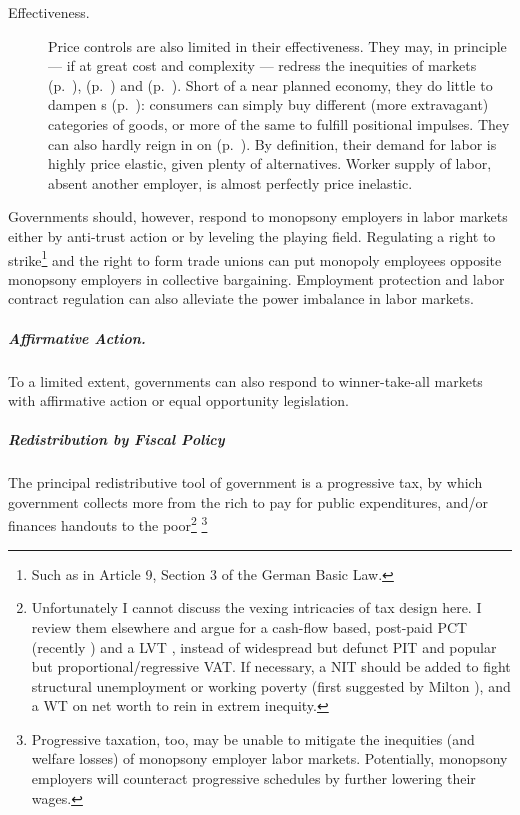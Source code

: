 \begin{description}
	\item[Effectiveness.] 
		Price controls are also limited in their effectiveness. They may, in principle --- if at great cost and complexity --- redress the inequities of  markets (p.~\pageref{sec:winne-take-all}),  (p.~\pageref{sec:differentbudgetconstraints}) and  (p.~\pageref{sec:diminishingmarginalutility}). Short of a near planned economy, they do little to dampen s (p.~\pageref{sec:positionalrace}):  consumers can simply buy different (more extravagant) categories of goods, or more of the same to fulfill positional impulses. They can also hardly reign in on  (p.~\pageref{sec:monopsonyemployers}). By definition, their demand for labor is highly price elastic, given plenty of alternatives. Worker supply of labor, absent another employer, is almost perfectly price inelastic. 
\end{description}

Governments should, however, respond to monopsony employers in labor markets either by anti-trust action or by leveling the playing field. Regulating a right to strike\footnote{Such as in Article 9, Section 3 of the German Basic Law.} and the right to form trade unions can put monopoly employees opposite monopsony employers in collective bargaining. Employment protection and labor contract regulation can also alleviate the power imbalance in labor markets.

\subparagraph{Affirmative Action.}  \label{sec:affirmativeaction} To a limited extent, governments can also respond to winner-take-all markets with affirmative action or equal opportunity legislation.

\subparagraph{Redistribution by Fiscal Policy}  \label{sec:fiscalredistribution} The principal redistributive tool of government is a progressive tax, by which government collects more from the rich to pay for public expenditures, and/or finances handouts to the poor\footnote{
	Unfortunately I cannot discuss the vexing intricacies of tax design here. I review them elsewhere \citep{Held2010a} and argue for a cash-flow based, post-paid \gls{PCT} (recently \citealt{McCaffery2002,McCaffery2005}) and a \gls{LVT} \citep{George1879}, instead of widespread but defunct \gls{PIT} and popular but proportional/regressive \gls{VAT}. If necessary, a \gls{NIT} should be added to fight structural unemployment or working poverty (first suggested by Milton \citealt{Friedman1962}), and a \gls{WT} on net worth to rein in extrem inequity.}
	\footnote{
	Progressive taxation, too, may be unable to mitigate the inequities (and welfare losses) of monopsony employer labor markets. Potentially, monopsony employers will counteract progressive schedules by further lowering their wages.} 


